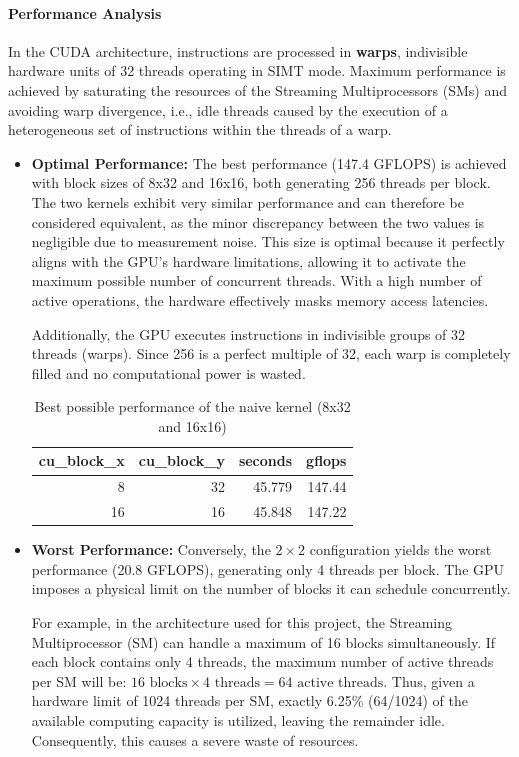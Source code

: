 \paragraph{Performance Analysis} In the CUDA architecture, instructions are processed in \textbf{warps}, indivisible hardware units of 32 threads operating in SIMT mode. Maximum performance is achieved by saturating the resources of the Streaming Multiprocessors (SMs) and avoiding warp divergence, i.e., idle threads caused by the execution of a heterogeneous set of instructions within the threads of a warp.
\begin{itemize}
    \item \textbf{Optimal Performance:} The best performance (147.4 GFLOPS) is achieved with block sizes of 8x32 and 16x16, both generating 256 threads per block. The two kernels exhibit very similar performance and can therefore be considered equivalent, as the minor discrepancy between the two values is negligible due to measurement noise. This size is optimal because it perfectly aligns with the GPU's hardware limitations, allowing it to activate the maximum possible number of concurrent threads. With a high number of active operations, the hardware effectively masks memory access latencies. 
    
    Additionally, the GPU executes instructions in indivisible groups of 32 threads (warps). Since 256 is a perfect multiple of 32, each warp is completely filled and no computational power is wasted.

\begin{table}[h]
\centering
\begin{tabular}{rrrr}
\toprule
cu\_block\_x & cu\_block\_y & seconds & gflops \\
\midrule
8 & 32 & 45.779 & 147.44 \\
16 & 16 & 45.848 & 147.22 \\
\bottomrule
\end{tabular}
\caption{Best possible performance of the naive kernel (8x32  and 16x16)}
\label{tab:optimal_blocks_perf}
\end{table}

\item \textbf{Worst Performance:} Conversely, the $2 \times 2$ configuration yields the worst performance (20.8 GFLOPS), generating only 4 threads per block. The GPU imposes a physical limit on the number of blocks it can schedule concurrently. 

For example, in the architecture used for this project, the Streaming Multiprocessor (SM) can handle a maximum of 16 blocks simultaneously. If each block contains only 4 threads, the maximum number of active threads per SM will be: $16 \text{ blocks} \times 4 \text{ threads} = 64 \text{ active threads}$. Thus, given a hardware limit of 1024 threads per SM, exactly 6.25\% (64/1024) of the available computing capacity is utilized, leaving the remainder idle. Consequently, this causes a severe waste of resources.


\end{itemize}
